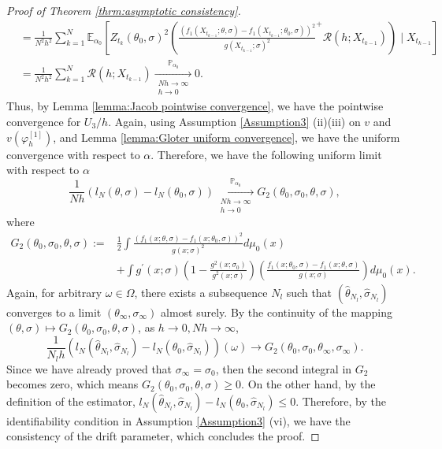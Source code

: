 \documentclass[a4paper,12pt]{article}
\numberwithin{equation}{section}
\theoremstyle{plain}
\theoremstyle{definition}
\begin{document}
\begin{appendix}
\begin{proof}[Proof of Theorem \ref{thrm:asymptotic consistency}]
\begin{align*}
         &=\frac{1}{N^2h^2}\sum_{k=1}^N\mathbb{E}_{\alpha_0}\left[Z_{t_k}(\theta_0,\sigma)^2\left(\frac{\left(f_1(X_{t_{k-1}};\theta,\sigma)-f_1(X_{t_{k-1}};\theta_0,\sigma)\right)^2}{g(X_{t_{k-1}};\sigma)^2}^+\mathcal{R}(h;X_{t_{k-1}})\right)\mid X_{t_{k-1}}\right]\\
        &=\frac{1}{N^2h^2}\sum_{k=1}^N\mathcal{R}(h;X_{t_{k-1}})\xrightarrow[\substack{N h\rightarrow\infty \\ h \rightarrow 0}]{\mathbb{P}_{\alpha_0}}0.
    \end{align*}
    Thus, by Lemma \ref{lemma:Jacob pointwise convergence}, we have the pointwise convergence for $U_3/h$. Again, using Assumption \ref{Assumption3} (ii)(iii) 
    on $v$ and $v(\varphi^{[1]}_h)$, and Lemma \ref{lemma:Gloter uniform convergence}, we have the uniform convergence with respect to $\alpha$. Therefore, we have the following uniform limit with respect to $\alpha$
    \begin{equation*}
        \frac{1}{Nh}\left(l_N(\theta,\sigma)-l_N(\theta_0,\sigma)\right)\xrightarrow[\substack{N h\rightarrow\infty \\ h \rightarrow 0}]{\mathbb{P}_{\alpha_0}}G_2(\theta_0,\sigma_0,\theta,\sigma),
    \end{equation*}
    where
    \begin{align*}
        G_2(\theta_0,\sigma_0,\theta,\sigma):=&\frac{1}{2}\int\frac{\left(f_1(x;\theta,\sigma)-f_1(x;\theta_0,\sigma)\right)^2}{g(x;\sigma)^2}d\mu_0(x)\\
        &+\int g^{\prime}(x ; \sigma)\left(1-\frac{g^2\left(x ; \sigma_0\right)}{g^2(x ; \sigma)}\right)\left(\frac{f_1\left(x ; \theta_0, \sigma\right)-f_1(x ; \theta, \sigma)}{g(x ;\sigma)}\right)d\mu_0(x).
    \end{align*}
    Again, for arbitrary $\omega\in \Omega$, there exists a subsequence $N_l$ such that $(\hat{\theta}_{N_l},\hat{\sigma}_{N_l})$ converges to a limit $(\theta_\infty,\sigma_\infty)$ almost surely. By the continuity of the mapping $(\theta,\sigma)\mapsto G_2(\theta_0,\sigma_0,\theta,\sigma)$, as $h\to0,Nh\to \infty$,
    \begin{equation*}
        \frac{1}{N_lh}\left(l_N(\hat{\theta}_{N_l},\hat{\sigma}_{N_l})-l_N(\theta_0,\hat{\sigma}_{N_l})\right)(\omega)\to G_2(\theta_0,\sigma_0,\theta_\infty,\sigma_\infty).
    \end{equation*}
    Since we have already proved that $\sigma_\infty=\sigma_0$, then the second integral in $G_2$ becomes zero, which means $G_2(\theta_0,\sigma_0,\theta,\sigma)\geq0$. On the other hand, by the definition of the estimator, $l_N(\hat{\theta}_{N_l},\hat{\sigma}_{N_l})-l_N(\theta_0,\hat{\sigma}_{N_l})\leq 0$. Therefore, by the identifiability condition in Assumption \ref{Assumption3} (vi), we have the consistency of the drift parameter, which concludes the proof.
\end{proof}

\end{appendix}
\end{document}
